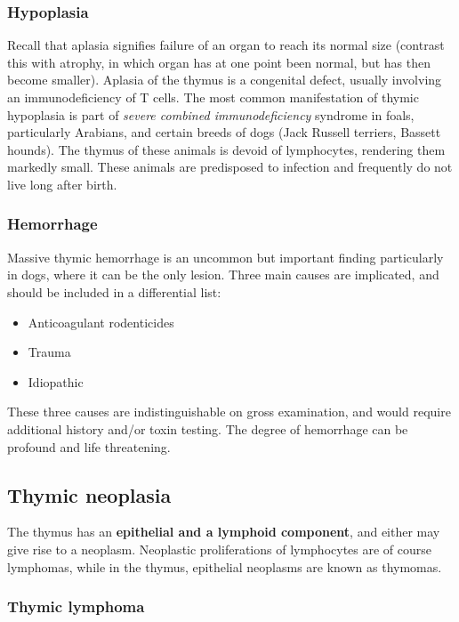\documentclass[openany]{article}
\providecommand{\tightlist}{%
  \setlength{\itemsep}{0pt}\setlength{\parskip}{0pt}}
\begin{document}
\subsubsection{Hypoplasia}\label{hypoplasia-1}

Recall that aplasia signifies failure of an organ to reach its normal
size (contrast this with atrophy, in which organ has at one point been
normal, but has then become smaller). Aplasia of the thymus is a
congenital defect, usually involving an immunodeficiency of T cells. The
most common manifestation of thymic hypoplasia is part of \emph{severe
combined immunodeficiency} syndrome in foals, particularly Arabians, and
certain breeds of dogs (Jack Russell terriers, Bassett hounds). The
thymus of these animals is devoid of lymphocytes, rendering them
markedly small. These animals are predisposed to infection and
frequently do not live long after birth.

\subsubsection{Hemorrhage}\label{hemorrhage}

Massive thymic hemorrhage is an uncommon but important finding
particularly in dogs, where it can be the only lesion. Three main causes
are implicated, and should be included in a differential list:

\begin{itemize}
\tightlist
\item
  Anticoagulant rodenticides
\item
  Trauma
\item
  Idiopathic
\end{itemize}

These three causes are indistinguishable on gross examination, and would
require additional history and/or toxin testing. The degree of
hemorrhage can be profound and life threatening.

\subsection{Thymic neoplasia}\label{thymic-neoplasia}

The thymus has an \textbf{epithelial and a lymphoid component}, and
either may give rise to a neoplasm. Neoplastic proliferations of
lymphocytes are of course lymphomas, while in the thymus, epithelial
neoplasms are known as thymomas.

\subsubsection{Thymic lymphoma}\label{thymic-lymphoma}
\end{document}
